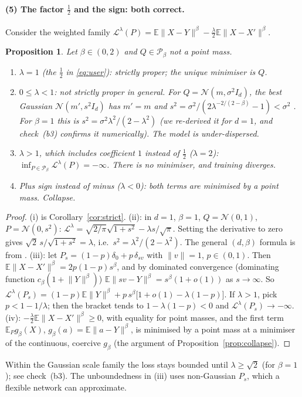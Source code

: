 \documentclass[11pt]{article}
\newtheorem{proposition}[theorem]{Proposition}
\theoremstyle{definition}
\theoremstyle{remark}
\newcommand{\E}{\mathbb{E}}
\newcommand{\Pb}{\mathcal{P}}
\newcommand{\N}{\mathcal{N}}
\newcommand{\norm}[1]{\lVert #1\rVert}
\begin{document}
\paragraph{(5) The factor $\tfrac12$ and the sign: both correct.} Consider the weighted family
$\mathcal L^\lambda(P)=\E\norm{X-Y}^\beta-\tfrac{\lambda}{2}\E\norm{X-X'}^\beta$.
\begin{proposition}\label{prop:lambda}
Let $\beta\in(0,2)$ and $Q\in\Pb_\beta$ not a point mass.
\begin{enumerate}
\item[(i)] $\lambda=1$ (the $\tfrac12$ in \eqref{eq:user}): strictly proper; the unique minimiser is $Q$.
\item[(ii)] $0\le\lambda<1$: not strictly proper in general. For $Q=\N(m,\sigma^2I_d)$, the best Gaussian
$\N(m',s^2I_d)$ has $m'=m$ and $s^2=\sigma^2/(2\lambda^{-2/(2-\beta)}-1)<\sigma^2$
\cite[Prop.~4.1]{DeBortoli2025}. For $\beta=1$ this is $s^2=\sigma^2\lambda^2/(2-\lambda^2)$ (we re-derived
it for $d=1$, and check~(b3) confirms it numerically). The model is under-dispersed.
\item[(iii)] $\lambda>1$, which includes coefficient $1$ instead of $\tfrac12$ ($\lambda=2$):
$\inf_{P\in\Pb_\beta}\mathcal L^\lambda(P)=-\infty$. There is no minimiser, and training diverges.
\item[(iv)] Plus sign instead of minus ($\lambda<0$): both terms are minimised by a point mass. Collapse.
\end{enumerate}
\end{proposition}
\begin{proof}
(i) is Corollary~\ref{cor:strict}. (ii): in $d=1$, $\beta=1$, $Q=\N(0,1)$, $P=\N(0,s^2)$:
$\mathcal L^\lambda=\sqrt{2/\pi}\sqrt{1+s^2}-\lambda s/\sqrt\pi$. Setting the derivative to zero gives
$\sqrt2\,s/\sqrt{1+s^2}=\lambda$, i.e.\ $s^2=\lambda^2/(2-\lambda^2)$. The general $(d,\beta)$ formula is
from \cite{DeBortoli2025}. (iii): let $P_s=(1-p)\delta_0+p\,\delta_{sv}$ with $\norm v=1$, $p\in(0,1)$. Then
$\E\norm{X-X'}^\beta=2p(1-p)s^\beta$, and by dominated convergence (dominating function
$c_\beta(1+\norm{Y}^\beta)$) $\E\norm{sv-Y}^\beta=s^\beta(1+o(1))$ as $s\to\infty$. So
$\mathcal L^\lambda(P_s)=(1-p)\E\norm Y^\beta+p\,s^\beta\big[1+o(1)-\lambda(1-p)\big]$. If $\lambda>1$,
pick $p<1-1/\lambda$; then the bracket tends to $1-\lambda(1-p)<0$ and $\mathcal L^\lambda(P_s)\to-\infty$.
(iv): $-\tfrac{\lambda}{2}\E\norm{X-X'}^\beta\ge0$, with equality for point masses, and the first term
$\E_Pg_\beta(X)$, $g_\beta(a)=\E\norm{a-Y}^\beta$, is minimised by a point mass at a minimiser of the continuous,
coercive $g_\beta$ (the argument of Proposition~\ref{prop:collapse}).
\end{proof}
Within the Gaussian scale family the loss stays bounded until $\lambda\ge\sqrt2$ (for $\beta=1$); see
check~(b3). The unboundedness in (iii) uses non-Gaussian $P_s$, which a flexible network can approximate.
\end{document}

